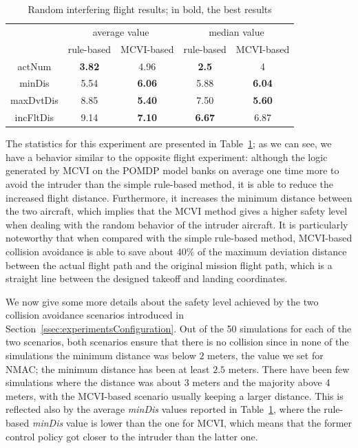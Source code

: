 \documentclass[orivec]{llncs}
\begin{document}
\begin{table}[t]
	\caption{Random interfering flight results; in bold, the best results}
	\label{tab:randomInterferingFlightAverageResults}
	\centering
	\begin{tabular}{c|cc|cc}
	& \multicolumn{2}{c|}{average value} & \multicolumn{2}{c}{median value}\\
	& rule-based & MCVI-based & rule-based & MCVI-based\\
	\hline
	actNum & \textbf{3.82} & 4.96 & \textbf{2.5} & 4 \\
	minDis & 5.54 & \textbf{6.06} & 5.88 & \textbf{6.04} \\
	maxDvtDis & 8.85 & \textbf{5.40} & 7.50 & \textbf{5.60} \\
	incFltDis & 9.14 & \textbf{7.10} & \textbf{6.67} & 6.87
	\end{tabular}
\end{table}
The statistics for this experiment are presented in Table~\ref{tab:randomInterferingFlightAverageResults};
as we can see, we have a behavior similar to the opposite flight experiment: 
although the logic generated by MCVI on the POMDP model banks on average one time more to avoid the intruder than the simple rule-based method, it is able to reduce the increased flight distance.
Furthermore, it increases the minimum distance between the two aircraft, which implies that the MCVI method gives a higher safety level when dealing with the random behavior of the intruder aircraft.
It is particularly noteworthy that when compared with the simple rule-based method, MCVI-based collision avoidance is able to save about $40\%$ of the maximum deviation distance between the actual flight path and the original mission flight path, which is a straight line between the designed takeoff and landing coordinates. 

We now give some more details about the safety level achieved by the two collision avoidance scenarios introduced in Section~\ref{ssec:experimentsConfiguration}.
Out of the 50 simulations for each of the two scenarios, 
both scenarios ensure that there is no collision since in none of the simulations the minimum distance was below $2$ meters, the value we set for NMAC;
the minimum distance has been at least $2.5$ meters.
There have been few simulations where the distance was about 3 meters and the majority above 4 meters, with the MCVI-based scenario usually keeping a larger distance.
This is reflected also by the average \emph{minDis} values reported in Table~\ref{tab:randomInterferingFlightAverageResults}, where the rule-based \emph{minDis} value is lower than the one for MCVI, which means that the former control policy got closer to the intruder than the latter one.
\end{document}

